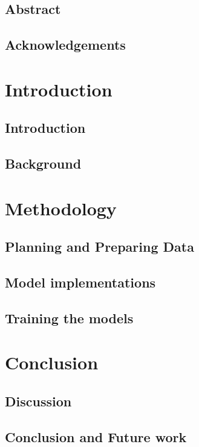 \documentclass[UKenglish]{ifimaster}
\title{\problemStatement}
\subtitle{
}
\author{Joakim I. Frogner}
\begin{document}
\duoforside[dept={Department of Informatics},
program={Programming and Networks},
long]

\frontmatter{}
\chapter*{Abstract}


\chapter*{Acknowledgements}


\tableofcontents{} 
\listoffigures{}
\listoftables{}

\mainmatter{}
\part{Introduction}

\chapter{Introduction}


\chapter{Background}



\part{Methodology}
\chapter{Planning and Preparing Data}


\chapter{Model implementations}


\chapter{Training the models}


\part{Conclusion}
\chapter{Discussion}


\chapter{Conclusion and Future work}


\backmatter{}
\printbibliography
\end{document}
